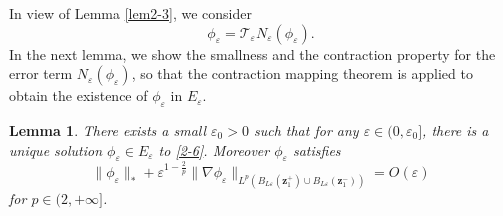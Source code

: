 \documentclass[12pt,reqno]{amsart}
\numberwithin{equation}{section}
\newtheorem{lemma}[theorem]{Lemma}
\theoremstyle{definition}
\theoremstyle{remark}
\begin{document}
	In view of Lemma \ref{lem2-3}, we consider
	\begin{equation*}
		\phi_\varepsilon=\mathcal T_\varepsilon N_\varepsilon(\phi_\varepsilon).
	\end{equation*}
	In the next lemma, we show the smallness and the contraction property for the error term $N_\varepsilon(\phi_\varepsilon)$, 
	so that the contraction mapping theorem is applied to obtain the existence of $\phi_\varepsilon$ in $E_\varepsilon$.
	\begin{lemma}\label{lem2-5}
		There exists a small $\varepsilon_0>0$ such that for any $\varepsilon\in(0,\varepsilon_0]$, there is a unique solution $\phi_\varepsilon\in E_\varepsilon$ to \eqref{2-6}. Moreover  $\phi_\varepsilon$ satisfies
		\begin{equation}\label{2-17}
			\|\phi_\varepsilon\|_*+\varepsilon^{1-\frac{2}{p}}\|\nabla\phi_\varepsilon\|_{L^p(B_{L\varepsilon}(\boldsymbol z_1^+)\cup B_{L\varepsilon}(\boldsymbol z_1^-))}= O(\varepsilon)
		\end{equation}
		for $p\in(2,+\infty]$.
	\end{lemma}
\end{document}
